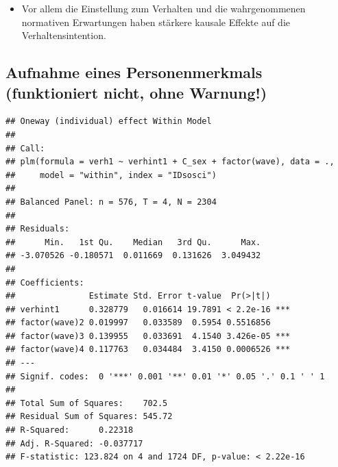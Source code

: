 \documentclass[]{book}
\newenvironment{Shaded}{\begin{snugshade}}{\end{snugshade}}
\newcommand{\DataTypeTok}[1]{\textcolor[rgb]{0.13,0.29,0.53}{#1}}
\newcommand{\KeywordTok}[1]{\textcolor[rgb]{0.13,0.29,0.53}{\textbf{#1}}}
\newcommand{\NormalTok}[1]{#1}
\newcommand{\OperatorTok}[1]{\textcolor[rgb]{0.81,0.36,0.00}{\textbf{#1}}}
\newcommand{\StringTok}[1]{\textcolor[rgb]{0.31,0.60,0.02}{#1}}
\providecommand{\tightlist}{%
  \setlength{\itemsep}{0pt}\setlength{\parskip}{0pt}}
\begin{document}
\begin{itemize}
\tightlist
\item
  Vor allem die Einstellung zum Verhalten und die wahrgenommenen normativen Erwartungen haben stärkere kausale Effekte auf die Verhaltensintention.
\end{itemize}

\hypertarget{aufnahme-eines-personenmerkmals-funktioniert-nicht-ohne-warnung}{%
\subsection*{Aufnahme eines Personenmerkmals (funktioniert nicht, ohne Warnung!)}\label{aufnahme-eines-personenmerkmals-funktioniert-nicht-ohne-warnung}}

\begin{Shaded}
\end{Shaded}

\begin{verbatim}
## Oneway (individual) effect Within Model
## 
## Call:
## plm(formula = verh1 ~ verhint1 + C_sex + factor(wave), data = ., 
##     model = "within", index = "IDsosci")
## 
## Balanced Panel: n = 576, T = 4, N = 2304
## 
## Residuals:
##      Min.   1st Qu.    Median   3rd Qu.      Max. 
## -3.070526 -0.180571  0.011669  0.131626  3.049432 
## 
## Coefficients:
##               Estimate Std. Error t-value  Pr(>|t|)    
## verhint1      0.328779   0.016614 19.7891 < 2.2e-16 ***
## factor(wave)2 0.019997   0.033589  0.5954 0.5516856    
## factor(wave)3 0.139955   0.033691  4.1540 3.426e-05 ***
## factor(wave)4 0.117763   0.034484  3.4150 0.0006526 ***
## ---
## Signif. codes:  0 '***' 0.001 '**' 0.01 '*' 0.05 '.' 0.1 ' ' 1
## 
## Total Sum of Squares:    702.5
## Residual Sum of Squares: 545.72
## R-Squared:      0.22318
## Adj. R-Squared: -0.037717
## F-statistic: 123.824 on 4 and 1724 DF, p-value: < 2.22e-16
\end{verbatim}
\end{document}
